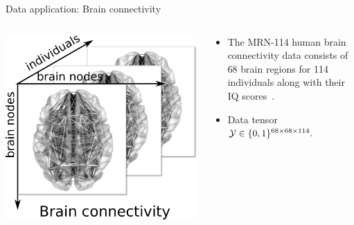 \documentclass[10pt, mathserif]{beamer} %
\theoremstyle{definition}
\theoremstyle{plain}
\begin{document}
\begin{frame}{Data application: Brain connectivity}
\begin{columns}
\begin{column}{0.21\textwidth}
   \begin{center}
     \includegraphics[width=\textwidth]{Figures/braindata.pdf}
     \end{center}
\end{column}
\begin{column}{0.7\textwidth} 
\begin{itemize}
    \item The MRN-114 human brain connectivity data consists of 68 brain regions for 114 individuals along with their IQ scores~.
    \item  Data tensor $\mathcal{Y}\in\{0,1\}^{68\times68\times114}.$
\end{itemize}
\end{column}
\end{columns}


\end{frame}
\end{document}
